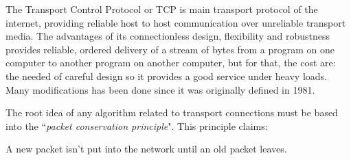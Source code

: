 
The Transport Control Protocol or TCP is main transport protocol of the
internet, providing reliable host to host communication over unreliable
transport media\cite{RFC793}. The advantages of its connectionless design,
flexibility and robustness provides reliable, ordered delivery of a stream of
bytes from a program on one computer to another program on another computer,
but for that, the cost are: the needed of careful design so it provides a good
service under heavy loads. Many modifications has been done since it was
originally defined in 1981.

The root idea of any algorithm related to transport connections must be based
into the ``\textit{packet conservation principle}". This principle claims:

\begin{defn}
A new packet isn't put into the network until an old packet leaves.
\end{defn}
